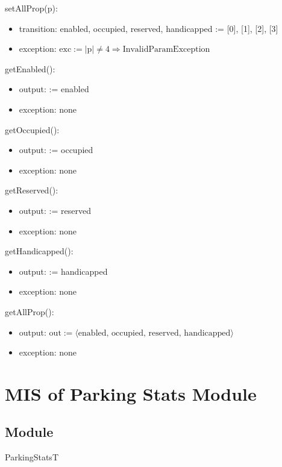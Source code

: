 \documentclass[12pt, titlepage]{article}
\begin{document}
\noindent setAllProp(p):
\begin{itemize} 
\item transition: enabled, occupied, reserved, handicapped := [0],
[1], [2], [3]
\item exception: $\text{exc} := |\text{p}| \neq 4 \Rightarrow
\text{InvalidParamException}$
\end{itemize}

\noindent getEnabled():
\begin{itemize} 
\item output:  := enabled
\item exception: none
\end{itemize}

\noindent getOccupied():
\begin{itemize} 
\item output:  := occupied
\item exception: none
\end{itemize}

\noindent getReserved():
\begin{itemize} 
\item output:  := reserved
\item exception: none
\end{itemize}

\noindent getHandicapped():
\begin{itemize} 
\item output:  := handicapped
\item exception: none
\end{itemize}

\noindent getAllProp():
\begin{itemize} 
\item output: $\text{out} := \langle \text{enabled, occupied, reserved,
handicapped} \rangle$
\item exception: none
\end{itemize}

\newpage

\section{MIS of Parking Stats Module} 
\label{parkingStats:Module}

\subsection{Module}
ParkingStatsT
\end{document}
